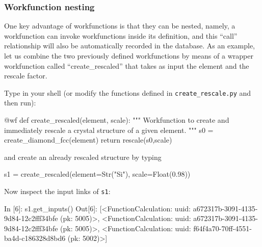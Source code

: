 \subsubsection{Workfunction nesting}
One key advantage of workfunctions is that they can be nested, namely, a workfunction can invoke workfunctions inside its definition, and this ``call'' relationship will also be automatically recorded in the database. 
As an example, let us combine the two previously defined workfunctions by means of a wrapper workfunction called ``create\_rescaled'' that takes as input the element and the rescale factor.
\begin{tcolorbox}
Type in your shell (or modify the functions defined in \texttt{create\_rescale.py} and then run):
\end{tcolorbox}
\begin{pythoncommand}
@wf
def create_rescaled(element, scale):
    """
    Workfunction to create and immediately rescale
    a crystal structure of a given element.
    """
    s0 = create_diamond_fcc(element)
    return rescale(s0,scale)
\end{pythoncommand}
and create an already rescaled structure by typing 
\begin{pythoncommand}
s1 = create_rescaled(element=Str("Si"), scale=Float(0.98))
\end{pythoncommand}
\begin{tcolorbox}
Now inspect the input links of \texttt{s1}:
\end{tcolorbox}
\begin{pythoncommand}
In [6]: s1.get_inputs()
Out[6]: 
[<FunctionCalculation: uuid: a672317b-3091-4135-9d84-12c2fff34bfe (pk: 5005)>,
 <FunctionCalculation: uuid: a672317b-3091-4135-9d84-12c2fff34bfe (pk: 5005)>,
 <FunctionCalculation: uuid: f64f4a70-70ff-4551-ba4d-c186328d8bd6 (pk: 5002)>]
\end{pythoncommand}

